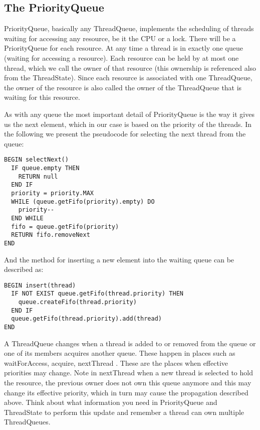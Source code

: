 \documentclass[a4paper,10pt]{article}
\begin{document}
\subsection{The PriorityQueue}

PriorityQueue, basically any ThreadQueue, implements the scheduling of threads waiting for accessing any resource, be it the CPU or a lock. There will be a PriorityQueue for each resource. At any time a thread is in exactly one queue (waiting for accessing a resource). Each resource can be held by at most one thread, which we call the owner of that resource (this ownership is referenced also from the ThreadState). Since each resource is associated with one ThreadQueue, the owner of the resource is also called the owner of the ThreadQueue that is waiting for this resource.

As with any queue the most important detail of PriorityQueue is the way it gives us the next element, which in our case is based on the priority of the threads. In the following we present the pseudocode for selecting the next thread from the queue:
\begin{verbatim}
BEGIN selectNext()
  IF queue.empty THEN 
    RETURN null 
  END IF
  priority = priority.MAX
  WHILE (queue.getFifo(priority).empty) DO
    priority--
  END WHILE
  fifo = queue.getFifo(priority)
  RETURN fifo.removeNext
END
\end{verbatim}

And the method for inserting a new element into the waiting queue can be described as:
\begin{verbatim}
BEGIN insert(thread)
  IF NOT EXIST queue.getFifo(thread.priority) THEN 
    queue.createFifo(thread.priority) 
  END IF
  queue.getFifo(thread.priority).add(thread)
END
\end{verbatim}



A ThreadQueue changes when a thread is added to or removed from the queue or one of its members acquires another queue. These happen in places such as waitForAccess,  acquire, nextThread . These are the places when effective priorities may change. Note in nextThread when a new thread is 
selected to hold the resource, the previous owner does not own this queue anymore and this 
may change its effective priority, which in turn may cause the propagation described above. 
Think about what information you need in PriorityQueue and ThreadState to perform this 
update and remember a thread can own multiple ThreadQueues.
\end{document}
